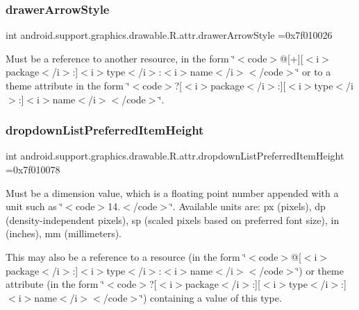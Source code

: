 \subsubsection{\texorpdfstring{drawer\+Arrow\+Style}{drawerArrowStyle}}
{\footnotesize\ttfamily int android.\+support.\+graphics.\+drawable.\+R.\+attr.\+drawer\+Arrow\+Style =0x7f010026\hspace{0.3cm}{\ttfamily [static]}}

Must be a reference to another resource, in the form \char`\"{}$<$code$>$@\mbox{[}+\mbox{]}\mbox{[}$<$i$>$package$<$/i$>$\+:\mbox{]}$<$i$>$type$<$/i$>$\+:$<$i$>$name$<$/i$>$$<$/code$>$\char`\"{} or to a theme attribute in the form \char`\"{}$<$code$>$?\mbox{[}$<$i$>$package$<$/i$>$\+:\mbox{]}\mbox{[}$<$i$>$type$<$/i$>$\+:\mbox{]}$<$i$>$name$<$/i$>$$<$/code$>$\char`\"{}. \mbox{\label{classandroid_1_1support_1_1graphics_1_1drawable_1_1R_1_1attr_ac842ae7fca59f1534dc972f35fe6d25f}} 
\subsubsection{\texorpdfstring{dropdown\+List\+Preferred\+Item\+Height}{dropdownListPreferredItemHeight}}
{\footnotesize\ttfamily int android.\+support.\+graphics.\+drawable.\+R.\+attr.\+dropdown\+List\+Preferred\+Item\+Height =0x7f010078\hspace{0.3cm}{\ttfamily [static]}}

Must be a dimension value, which is a floating point number appended with a unit such as \char`\"{}$<$code$>$14.\+5sp$<$/code$>$\char`\"{}. Available units are\+: px (pixels), dp (density-\/independent pixels), sp (scaled pixels based on preferred font size), in (inches), mm (millimeters). 

This may also be a reference to a resource (in the form \char`\"{}$<$code$>$@\mbox{[}$<$i$>$package$<$/i$>$\+:\mbox{]}$<$i$>$type$<$/i$>$\+:$<$i$>$name$<$/i$>$$<$/code$>$\char`\"{}) or theme attribute (in the form \char`\"{}$<$code$>$?\mbox{[}$<$i$>$package$<$/i$>$\+:\mbox{]}\mbox{[}$<$i$>$type$<$/i$>$\+:\mbox{]}$<$i$>$name$<$/i$>$$<$/code$>$\char`\"{}) containing a value of this type. \mbox{\label{classandroid_1_1support_1_1graphics_1_1drawable_1_1R_1_1attr_a055d4363031c891ac4bd46190d23dd16}} 
